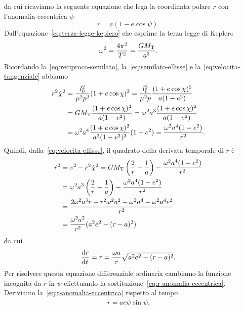 da cui ricaviamo la seguente equazione che lega la coordinata polare $r$ con
l'anomalia eccentrica $\psi$
\begin{equation}
  \label{eq:r-anomalia-eccentrica}
  r = a(1 - e\cos\psi).
\end{equation}
Dall'equazione~\eqref{eq:terza-legge-keplero} che esprime la terza legge di
Keplero
\begin{equation}
  \omega^2 = \frac{4\pi^2}{T^2} = \frac{GM_\textup{T}}{a^3}.
\end{equation}
Ricordando la~\eqref{eq:reciproco-semilato}, la~\eqref{eq:semilato-ellisse} e la~\eqref{eq:velocita-tangenziale} abbiamo
\begin{equation}
  \begin{split}
    r^2\dot{\chi}^2 &= \frac{l_0^2}{\mu^2p^2}(1 + e\cos\chi)^2 =
    \frac{l_0^2}{\mu^2p} \frac{(1+e\cos\chi)^2}{a(1-e^2)} \\
    &= GM_\textup{T} \frac{(1+e\cos\chi)^2}{a(1-e^2)} = \omega^2a^3
    \frac{(1+e\cos\chi)^2}{a(1-e^2)} \\
    &= \omega^2a^4 \frac{(1+e\cos\chi)^2}{a^2(1-e^2)^2}(1-e^2) =
    \frac{\omega^2a^4(1-e^2)}{r^2}.
  \end{split}
\end{equation}
Quindi, dalla~\eqref{eq:velocita-ellisse}, il quadrato della derivata temporale
di $r$ è
\begin{equation}
  \begin{split}
    \dot{r}^2 &= v^2 - r^2\dot{\chi}^2 = GM_\textup{T}
    \left(
      \frac{2}{r} - \frac{1}{a}
    \right) - \frac{\omega^2a^4(1-e^2)}{r^2} \\
        &= \omega^2a^3
    \left(
      \frac{2}{r} - \frac{1}{a}
    \right) - \frac{\omega^2a^4(1-e^2)}{r^2} \\
    &= \frac{2\omega^2a^3r-r^2\omega^2a^2-\omega^2a^4+\omega^2a^4e^2}{r^2}\\
    &= \frac{\omega^2a^2}{r^2}(a^2e^2-(r-a)^2)
  \end{split}
\end{equation}
da cui
\begin{equation}
  \frac{{\mathop{}\!\mathrm{d}^{}}r}{\mathop{}\!\mathrm{d} {t}^{}} = \dot{r} = \frac{\omega a}{r}\sqrt{a^2e^2 - (r-a)^2}.
\end{equation}
Per risolvere questa equazione differenziale ordinaria cambiamo la funzione
incognita da $r$ in $\psi$ effettuando la
sostituzione~\eqref{eq:r-anomalia-eccentrica}. Deriviamo
la~\eqref{eq:r-anomalia-eccentrica} rispetto al tempo
\begin{equation}
  \dot{r} = ae\dot{\psi}\sin\psi.
\end{equation}
